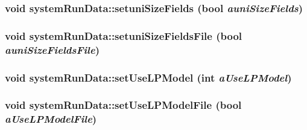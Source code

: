 \hypertarget{classsystem_run_data_a77d5d36f7912b616de7d8e9407e400f7}{
\subsubsection[{setuniSizeFields}]{\setlength{\rightskip}{0pt plus 5cm}void systemRunData::setuniSizeFields (bool {\em auniSizeFields})}}
\label{classsystem_run_data_a77d5d36f7912b616de7d8e9407e400f7}
\hypertarget{classsystem_run_data_a611fd18834ca93487fc173cb1053c152}{
\subsubsection[{setuniSizeFieldsFile}]{\setlength{\rightskip}{0pt plus 5cm}void systemRunData::setuniSizeFieldsFile (bool {\em auniSizeFieldsFile})}}
\label{classsystem_run_data_a611fd18834ca93487fc173cb1053c152}
\hypertarget{classsystem_run_data_a97743167871b2e7d4a8ad89f5f15cef2}{
\subsubsection[{setUseLPModel}]{\setlength{\rightskip}{0pt plus 5cm}void systemRunData::setUseLPModel (int {\em aUseLPModel})}}
\label{classsystem_run_data_a97743167871b2e7d4a8ad89f5f15cef2}
\hypertarget{classsystem_run_data_a2c88cf333aed87dc98d1ba3d0b9339d8}{
\subsubsection[{setUseLPModelFile}]{\setlength{\rightskip}{0pt plus 5cm}void systemRunData::setUseLPModelFile (bool {\em aUseLPModelFile})}}
